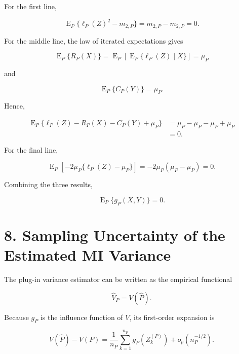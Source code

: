 \documentclass[
  11pt]{article}
\let\originalsection\section
\renewcommand{\section}{\clearpage\originalsection}
\begin{document}
For the first line,

\begin{equation}
\operatorname E_P\{\ell_P(Z)^2-m_{2,P}\}=m_{2,P}-m_{2,P}=0.
\end{equation}

For the middle line, the law of iterated expectations gives

\begin{equation}
\operatorname E_P\{R_P(X)\}
=\operatorname E_P[\operatorname E_P\{\ell_P(Z)\mid X\}]
=\mu_P
\end{equation}

and

\begin{equation}
\operatorname E_P\{C_P(Y)\}=\mu_P.
\end{equation}

Hence,

\begin{equation}
\begin{aligned}
\operatorname E_P\{\ell_P(Z)-R_P(X)-C_P(Y)+\mu_P\}
&=\mu_P-\mu_P-\mu_P+\mu_P\\
&=0.
\end{aligned}
\end{equation}

For the final line,

\begin{equation}
\operatorname E_P[-2\mu_P\{\ell_P(Z)-\mu_P\}]
=-2\mu_P(\mu_P-\mu_P)
=0.
\end{equation}

Combining the three results,

\begin{equation}
\boxed{
\operatorname E_P\{g_P(X,Y)\}=0.
}
\end{equation}

\section{8. Sampling Uncertainty of the Estimated MI
Variance}\label{sampling-uncertainty-of-the-estimated-mi-variance}

The plug-in variance estimator can be written as the empirical
functional

\begin{equation}
\widehat V_P=V(\widehat P).
\end{equation}

Because \(g_P\) is the influence function of \(V\), its first-order
expansion is

\begin{equation}
V(\widehat P)-V(P)
=\frac{1}{n_P}\sum_{k=1}^{n_P}g_P(Z_k^{(P)})
+o_p(n_P^{-1/2}).
\end{equation}
\end{document}
